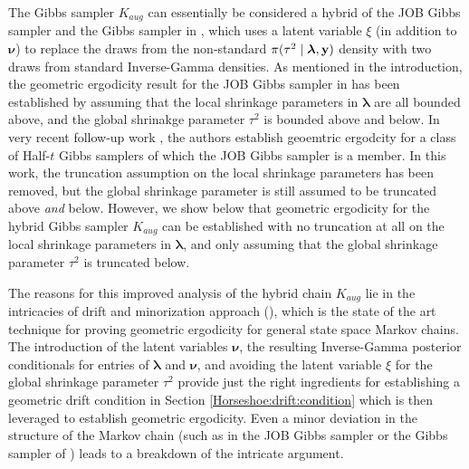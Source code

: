 \documentclass[noinfoline,11pt]{imsart}
\numberwithin{equation}{section}
\theoremstyle{plain}
\newcommand{\bl}{\boldsymbol{\lambda}}
\newcommand\Myciteauthor[1]{\citeauthor{#1} \cite{#1}}
\begin{document}
The Gibbs sampler $K_{aug}$ can essentially be considered a hybrid of the JOB Gibbs sampler and the Gibbs sampler in \Myciteauthor{Makalic_2016}, which uses a latent variable $\xi$ (in addition to ${\boldsymbol \nu}$) to replace the draws from the non-standard $\pi(\tau^2 \mid {\boldsymbol \lambda}, {\bf y})$ density with two draws from standard Inverse-Gamma densities. As mentioned in the introduction, the geometric ergodicity result for the JOB Gibbs sampler in 
\cite[Theorem 14]{johndrow2017bayes} has been established by assuming that the local shrinkage parameters in $\bl$ are all bounded above, and the global 
shrinakge parameter $\tau^2$ is bounded above and below. In very recent follow-up work \cite{BBJJ:2020}, the authors establish geoemtric ergodcity for a class of Half-$t$ Gibbs samplers of which the JOB Gibbs sampler is a member. In this work, the truncation assumption on the local shrinkage parameters has been removed, but the global shrinkage parameter is still 
assumed to be truncated above {\it and} below. However, we show below that geometric ergodicity for the hybrid Gibbs sampler $K_{aug}$ can be established with no truncation at all on the local shrinkage parameters in ${\boldsymbol \lambda}$, and only assuming that the global shrinkage parameter $\tau^2$ is truncated below. 

The reasons for this improved analysis of the hybrid chain $K_{aug}$ lie in the intricacies of drift and minorization approach (\cite{10.2307/2291067}), which is the state of the art technique for proving geometric ergodicity for general state space Markov chains. The introduction of the latent variables ${\boldsymbol \nu}$, the resulting Inverse-Gamma posterior conditionals for entries of ${\boldsymbol \lambda}$ and ${\boldsymbol \nu}$, and avoiding the latent variable $\xi$ for the global shrinkage parameter $\tau^2$ provide just the right ingredients for establishing a geometric drift condition in Section \ref{Horseshoe:drift:condition} which is then leveraged to establish geometric ergodicity. Even a minor deviation in the structure of the Markov chain (such as in the JOB Gibbs sampler or the Gibbs sampler of \cite{Makalic_2016}) leads to a breakdown of the intricate argument. 
\end{document}
